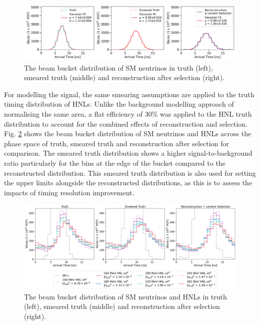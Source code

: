 \begin{figure}[ht!]
    \centering
    \includegraphics[width=\textwidth]{truth_smear_reco_gaus.png}
    \caption{The beam bucket distribution of SM neutrinos in truth (left), smeared truth (middle) and reconstruction after selection (right).}
    \label{fig:gaus_truth_smear}
\end{figure}

For modelling the signal, the same smearing assumptions are applied to the truth timing distribution of HNLs. 
Unlike the background modelling approach of normalising the same area, a flat efficiency of 30\% was applied to the HNL truth distribution to account for the combined effects of reconstruction and selection.
Fig. \ref{fig:hnl_sm_smear} shows the beam bucket distribution of SM neutrinos and HNLs across the phase space of truth, smeared truth and reconstruction after selection for comparison. 
The smeared truth distribution shows a higher signal-to-background ratio particularly for the bins at the edge of the bucket compared to the reconstructed distribution.
This smeared truth distribution is also used for setting the upper limits alongside the reconstructed distributions, as this is to assess the impacts of timing resolution improvement.

\begin{figure}[ht!]
    \centering
    \includegraphics[width=\textwidth]{truth_smear_zoom.png}
    \caption{The beam bucket distribution of SM neutrinos and HNLs in truth (left), smeared truth (middle) and reconstruction after selection (right).}
    \label{fig:hnl_sm_smear}
\end{figure}

